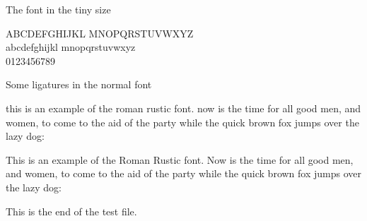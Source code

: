 \documentclass{article}
\newcommand{\ABC}{ABCDEFGHIJKL MNOPQRSTUVWXYZ}
\newcommand{\abc}{abcdefghijkl mnopqrstuvwxyz}
\newcommand{\figs}{0123456789}
\newcommand{\sentence}{%
this is an example of the roman rustic font. now is the time for all good
men, and women, to come to the aid of the party while the quick brown fox
jumps over the lazy dog:}
\newcommand{\Sentence}{%
This is an example of the Roman Rustic font. Now is the time for all good
men, and women, to come to the aid of the party while the quick brown fox
jumps over the lazy dog:}
\begin{document}
\begin{center}
The font in the tiny size \\ \par
{\rustfamily\tiny \ABC{} \\ \abc\\ \figs\\ \par } 
\end{center}

\begin{center}
    Some ligatures in the normal font \\
\end{center}



{
\rustfamily 
\sentence{}

\Sentence{}

}
    
    This is the end of the test file.
\end{document}
